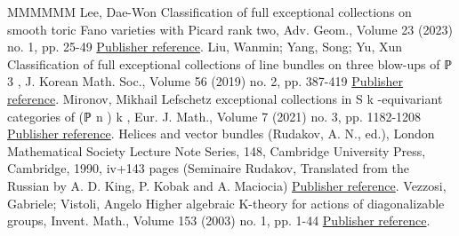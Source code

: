 \begin{thebibliography}{MMMMMM}
 Lee, Dae-Won Classification of full exceptional collections on smooth toric Fano varieties with Picard rank two, Adv. Geom., Volume 23 (2023) no. 1, pp. 25-49 \href{https://alco.centre-mersenne.org/articles/10.5802/alco.371/#pic2Fano}{Publisher reference}.
 Liu, Wanmin; Yang, Song; Yu, Xun Classification of full exceptional collections of line bundles on three blow-ups of ℙ 3 , J. Korean Math. Soc., Volume 56 (2019) no. 2, pp. 387-419 \href{https://alco.centre-mersenne.org/articles/10.5802/alco.371/#LiuYangYu}{Publisher reference}.
 Mironov, Mikhail Lefschetz exceptional collections in S k -equivariant categories of (ℙ n ) k , Eur. J. Math., Volume 7 (2021) no. 3, pp. 1182-1208 \href{https://alco.centre-mersenne.org/articles/10.5802/alco.371/#Mironov}{Publisher reference}.
 Helices and vector bundles (Rudakov, A. N., ed.), London Mathematical Society Lecture Note Series, 148, Cambridge University Press, Cambridge, 1990, iv+143 pages (Seminaire Rudakov, Translated from the Russian by A. D. King, P. Kobak and A. Maciocia) \href{https://alco.centre-mersenne.org/articles/10.5802/alco.371/#rudakov}{Publisher reference}.
 Vezzosi, Gabriele; Vistoli, Angelo Higher algebraic K-theory for actions of diagonalizable groups, Invent. Math., Volume 153 (2003) no. 1, pp. 1-44 \href{https://alco.centre-mersenne.org/articles/10.5802/alco.371/#vv}{Publisher reference}.
\end{thebibliography}
